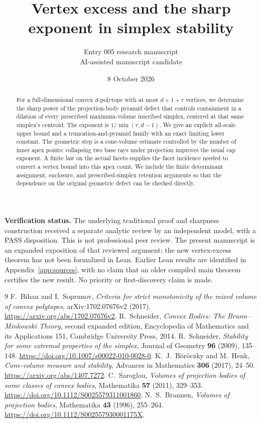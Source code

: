 \documentclass[11pt]{article}
\title{Vertex excess and the sharp exponent in simplex stability}
\author{Entry 005 research manuscript\\\small AI-assisted manuscript candidate}
\date{8 October 2026}
\numberwithin{equation}{section}
\theoremstyle{remark}\newtheorem{remark}[theorem]{Remark}
\begin{document}
\maketitle
\begin{abstract}
For a full-dimensional convex $d$-polytope with at most $d+1+r$ vertices,
we determine the sharp power of the projection-body pyramid defect that
controls containment in a dilation of every prescribed maximum-volume
inscribed simplex, centered at that same simplex's centroid. The exponent
is $1/\min(r,d-1)$. We give an explicit all-scale upper bound and a
truncation-and-pyramid family with an exact limiting lower constant.
The geometric step is a cone-volume estimate controlled by the number of
inner apex points: collapsing two base rays under projection improves the
usual cap exponent. A finite law on the actual facets supplies the facet
incidence needed to convert a vertex bound into this apex count. We include
the finite determinant assignment, enclosure, and prescribed-simplex
retention arguments so that the dependence on the original geometric defect
can be checked directly.
\end{abstract}

\noindent\textbf{Verification status.} The underlying traditional proof and
sharpness construction received a separate analytic review by an independent
model, with a PASS disposition. This is not professional peer review. The
present manuscript is an expanded exposition of that reviewed argument;
the new vertex-excess theorem has not been formalized in Lean. Earlier Lean
results are identified in Appendix~\ref{app:sources}, with no claim that an
older compiled main theorem certifies the new result. No priority or
first-discovery claim is made.

\setcounter{tocdepth}{1}
\tableofcontents









\clearpage
\begin{thebibliography}{9}
F.~Bihan and I.~Soprunov,
\emph{Criteria for strict monotonicity of the mixed volume of convex polytopes},
arXiv:1702.07676v2 (2017).
\url{https://arxiv.org/abs/1702.07676v2}.
R.~Schneider, \emph{Convex Bodies: The Brunn--Minkowski Theory},
second expanded edition, Encyclopedia of Mathematics and its Applications
151, Cambridge University Press, 2014.
R.~Schneider, \emph{Stability for some extremal properties of the simplex},
Journal of Geometry \textbf{96} (2009), 135--148.
\url{https://doi.org/10.1007/s00022-010-0028-0}.
K.~J.~B\"or\"oczky and M.~Henk, \emph{Cone-volume measure and stability},
Advances in Mathematics \textbf{306} (2017), 24--50.
\url{https://arxiv.org/abs/1407.7272}.
C.~Saroglou, \emph{Volumes of projection bodies of some classes of convex bodies},
Mathematika \textbf{57} (2011), 329--353.
\url{https://doi.org/10.1112/S0025579311001860}.
N.~S.~Brannen, \emph{Volumes of projection bodies},
Mathematika \textbf{43} (1996), 255--264.
\url{https://doi.org/10.1112/S002557930001175X}.
\end{thebibliography}
\end{document}

